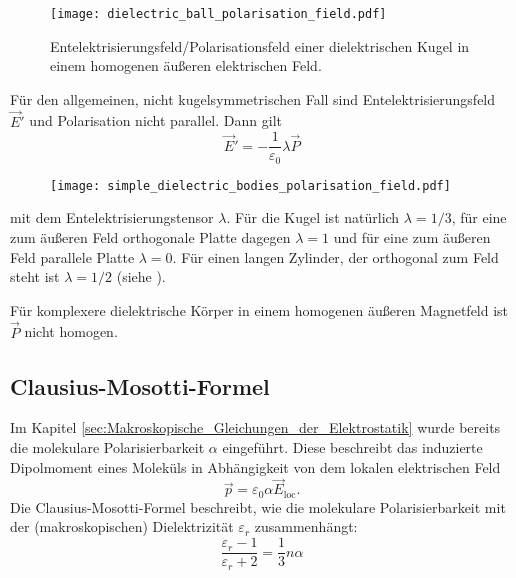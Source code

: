 \begin{figure}[htb]
	\centering
	\texttt{[image: dielectric\_ball\_polarisation\_field.pdf]}
	\caption{Entelektrisierungsfeld/Polarisationsfeld einer dielektrischen Kugel in einem homogenen äußeren elektrischen Feld. }
	\label{fig:dielectric_ball_polarisation_field}
\end{figure}


Für den allgemeinen, nicht kugelsymmetrischen Fall sind Entelektrisierungsfeld $\vec {E}'$ und Polarisation nicht parallel. Dann gilt
\begin{equation*}
	\vec {E}'=-\frac{1}{\varepsilon _{0}}\lambda \vec {P}
\end{equation*}


\begin{figure}[htb]
	\centering
	\texttt{[image: simple\_dielectric\_bodies\_polarisation\_field.pdf]}
	\caption{}
	\label{fig:simple_dielectric_bodies_polarisation_field}
\end{figure}

mit dem Entelektrisierungstensor $\lambda$. Für die Kugel ist natürlich $\lambda =1/3$, für eine zum äußeren Feld orthogonale Platte dagegen $\lambda =1$ und für eine zum äußeren Feld parallele Platte $\lambda =0$. Für einen langen Zylinder, der orthogonal zum Feld steht ist $\lambda =1/2$ (siehe ).

Für komplexere dielektrische Körper in einem homogenen äußeren Magnetfeld ist $\vec {P}$ nicht homogen.



\subsection{Clausius-Mosotti-Formel}

Im Kapitel \ref{sec:Makroskopische_Gleichungen_der_Elektrostatik} wurde bereits die molekulare Polarisierbarkeit $\alpha $ eingeführt. Diese beschreibt das induzierte Dipolmoment eines Moleküls in Abhängigkeit von dem lokalen elektrischen Feld
\begin{equation*}
	\vec {p}=\varepsilon _{0}\alpha \vec {E}_{\mathrm{loc}}.
\end{equation*}
Die Clausius-Mosotti-Formel beschreibt, wie die molekulare Polarisierbarkeit mit der (makroskopischen) Dielektrizität $\varepsilon _{r}$ zusammenhängt:
\begin{equation*}
	\frac{\varepsilon _{r}-1}{\varepsilon _{r}+2}=\frac{1}{3}n\alpha
\end{equation*}


